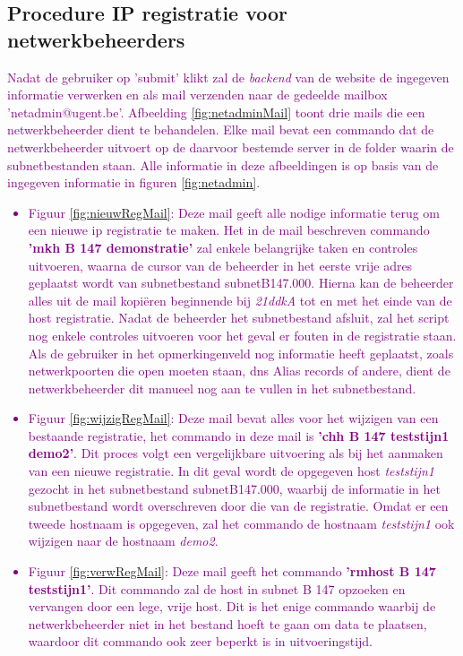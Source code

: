 \subsection{Procedure IP registratie voor netwerkbeheerders}
\textcolor{purple}{Nadat de gebruiker op 'submit' klikt zal de \textit{backend} van de website de ingegeven informatie verwerken en als mail verzenden naar de gedeelde mailbox 'netadmin@ugent.be'. Afbeelding \ref{fig:netadminMail} toont drie mails die een netwerkbeheerder dient te behandelen. Elke mail bevat een commando dat de netwerkbeheerder uitvoert op de daarvoor bestemde server in de folder waarin de subnetbestanden staan. Alle informatie in deze afbeeldingen is op basis van de ingegeven informatie in figuren \ref{fig:netadmin}.}
\textcolor{purple}{
    \begin{itemize}
        \item Figuur \ref{fig:nieuwRegMail}: Deze mail geeft alle nodige informatie terug om een nieuwe \acrshort{ip} registratie te maken. Het in de mail beschreven commando \textbf{'mkh B 147 demonstratie'} zal enkele belangrijke taken en controles uitvoeren, waarna de cursor van de beheerder in het eerste vrije adres geplaatst wordt van subnetbestand subnetB147.000. Hierna kan de beheerder alles uit de mail kopiëren beginnende bij \textit{21ddkA} tot en met het einde van de host registratie. Nadat de beheerder het subnetbestand afsluit, zal het script nog enkele controles uitvoeren voor het geval er fouten in de registratie staan. Als de gebruiker in het opmerkingenveld nog informatie heeft geplaatst, zoals netwerkpoorten die open moeten staan, \acrshort{dns} Alias records of andere, dient de netwerkbeheerder dit manueel nog aan te vullen in het subnetbestand.
        \item Figuur \ref{fig:wijzigRegMail}: Deze mail bevat alles voor het wijzigen van een bestaande registratie, het commando in deze mail is \textbf{'chh B 147 teststijn1 demo2'}. Dit proces volgt een vergelijkbare uitvoering als bij het aanmaken van een nieuwe registratie. In dit geval wordt de opgegeven host \textit{teststijn1} gezocht in het subnetbestand subnetB147.000, waarbij de informatie in het subnetbestand wordt overschreven door die van de registratie. Omdat er een tweede hostnaam is opgegeven, zal het commando de hostnaam \textit{teststijn1} ook wijzigen naar de hostnaam \textit{demo2}.
        \item Figuur \ref{fig:verwRegMail}: Deze mail geeft het commando \textbf{'rmhost B 147 teststijn1'}. Dit commando zal de host in subnet B 147 opzoeken en vervangen door een lege, vrije host. Dit is het enige commando waarbij de netwerkbeheerder niet in het bestand hoeft te gaan om data te plaatsen, waardoor dit commando ook zeer beperkt is in uitvoeringstijd.
\end{itemize}}

